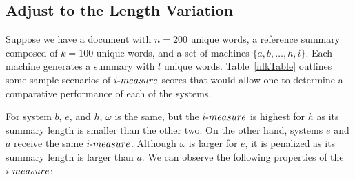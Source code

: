 \documentclass[a4paper]{report}
\begin{document}
\subsection{Adjust to the Length Variation}
Suppose we have a document with $n=200$ unique words, a reference summary composed of $k=100$ unique words, and a set of machines $\{a,b,\dots,h,i\}$. Each machine generates a summary with $l$ unique words. Table~\ref{nlkTable} outlines some sample scenarios of $i\hbox{-}measure$ scores that would allow one to determine a comparative performance of each of the systems.
\begin{table}[H]
{\caption{Sample Cases: {\em i-measure}}
\label{nlkTable}}
\end{table}
\par For system $b$, $e$, and $h$, $\omega$ is the same, but the $i\hbox{-}measure$ is highest for $h$ as its summary length is smaller than the other two. On the other hand, systems $e$ and $a$ receive the same $i\hbox{-}measure$. Although $\omega$ is larger for $e$, it is penalized as its summary length is larger than $a$.
We can observe the following properties of the $i\hbox{-}measure$:
\end{document}
